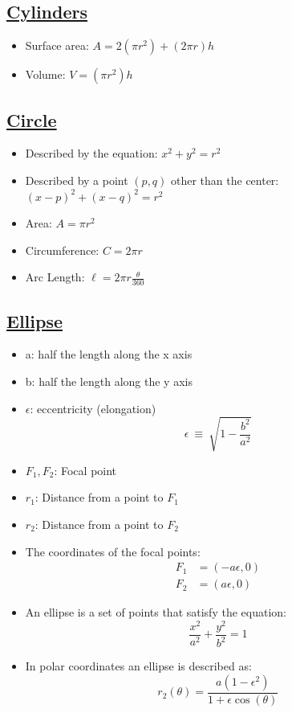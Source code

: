 \documentclass{article}
\begin{document}
\subsection{\underline{Cylinders}}
\begin{itemize}
  \item Surface area: $A = 2(\pi r^{2}) + (2\pi r)h$
  \item Volume: $V = (\pi r^{2})h$
\end{itemize}

\subsection{\underline{Circle}}
\begin{itemize}
  \item Described by the equation: $x^{2} + y^{2} = r^{2}$
  \item Described by a point $(p,q)$ other than the center: $(x - p)^{2} + (x - q)^{2} = r^{2}$
  \item Area: $A = \pi r^{2}$
  \item Circumference: $C = 2\pi r$
  \item Arc Length: $\ell = 2\pi r\frac{\theta}{360}$
\end{itemize}

\subsection{\underline{Ellipse}}
\begin{itemize}
  \item a: half the length along the x axis
  \item b: half the length along the y axis
  \item $\epsilon$: eccentricity (elongation)
  \begin{equation*}
    \epsilon\ \equiv\ \sqrt{1 - \frac{b^{2}}{a^{2}}}
  \end{equation*}
  \item $F_{1}, F_{2}$: Focal point
  \item $r_{1}$: Distance from a point to $F_{1}$
  \item $r_{2}$: Distance from a point to $F_{2}$
  \item The coordinates of the focal points:
  \begin{align*}
    F_{1} &= (-a\epsilon, 0)\\
    F_{2} &= (a\epsilon, 0)
  \end{align*}
  \item An ellipse is a set of points that satisfy the equation:
  \begin{equation*}
    \frac{x^{2}}{a^{2}} + \frac{y^{2}}{b^{2}} = 1
  \end{equation*}
  \item In polar coordinates an ellipse is described as:
  \begin{equation*}
    r_{2}(\theta) = \frac{a(1 - \epsilon^{2})}{1 + \epsilon\cos(\theta)}
  \end{equation*}
\end{itemize}
\end{document}
